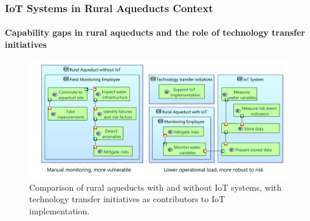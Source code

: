 \documentclass{beamer}
\begin{document}
\begin{frame}
    \frametitle{\small IoT Systems in Rural Aqueducts Context}
    \framesubtitle{Capability gaps in rural aqueducts and the role of technology transfer initiatives}

    \begin{figure}
        \centering
        \includegraphics[width=\textwidth]{images/before_and_after_iot.png}
        \caption{Comparison of rural aqueducts with and without IoT systems, with technology transfer initiatives as contributors to IoT implementation.}
    \end{figure}
\end{frame}
\end{document}
